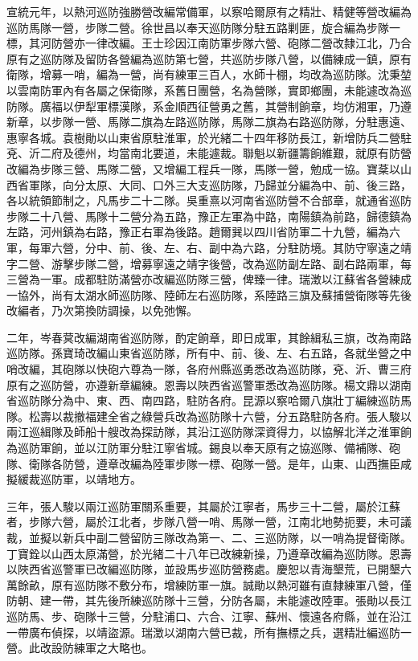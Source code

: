 \begin{pinyinscope}
宣統元年，以熱河巡防強勝營改編常備軍，以察哈爾原有之精壯、精健等營改編為巡防馬隊一營，步隊二營。徐世昌以奉天巡防隊分駐五路剿匪，旋合編為步隊一標，其河防營亦一律改編。王士珍因江南防軍步隊六營、砲隊二營改隸江北，乃合原有之巡防隊及留防各營編為巡防第七營，共巡防步隊八營，以備練成一鎮，原有衛隊，增募一哨，編為一營，尚有練軍三百人，水師十棚，均改為巡防隊。沈秉堃以雲南防軍內有各屬之保衛隊，系舊日團營，名為營隊，實即鄉團，未能遽改為巡防隊。廣福以伊犁軍標漢隊，系金順西征營勇之舊，其營制餉章，均仿湘軍，乃遵新章，以步隊一營、馬隊二旗為左路巡防隊，馬隊二旗為右路巡防隊，分駐惠遠、惠寧各城。袁樹勛以山東省原駐淮軍，於光緒二十四年移防長江，新增防兵二營駐兗、沂二府及德州，均當南北要道，未能遽裁。聯魁以新疆籌餉維艱，就原有防營改編為步隊三營、馬隊二營，又增編工程兵一隊，馬隊一營，勉成一協。寶棻以山西省軍隊，向分太原、大同、口外三大支巡防隊，乃歸並分編為中、前、後三路，各以統領節制之，凡馬步二十二隊。吳重熹以河南省巡防營不合部章，就通省巡防步隊二十八營、馬隊十二營分為五路，豫正左軍為中路，南陽鎮為前路，歸德鎮為左路，河州鎮為右路，豫正右軍為後路。趙爾巽以四川省防軍二十九營，編為六軍，每軍六營，分中、前、後、左、右、副中為六路，分駐防境。其防守寧遠之靖字二營、游擊步隊二營，增募寧遠之靖字後營，改為巡防副左路、副右路兩軍，每三營為一軍。成都駐防滿營亦改編巡防隊三營，俾臻一律。瑞澂以江蘇省各營練成一協外，尚有太湖水師巡防隊、陸師左右巡防隊，系陸路三旗及蘇捕營衛隊等先後改編者，乃次第換防調操，以免弛懈。

二年，岑春蓂改編湖南省巡防隊，酌定餉章，即日成軍，其餘緝私三旗，改為南路巡防隊。孫寶琦改編山東省巡防隊，所有中、前、後、左、右五路，各就坐營之中哨改編，其砲隊以快砲六尊為一隊，各府州縣巡勇悉改為巡防隊，兗、沂、曹三府原有之巡防營，亦遵新章編練。恩壽以陜西省巡警軍悉改為巡防隊。楊文鼎以湖南省巡防隊分為中、東、西、南四路，駐防各府。昆源以察哈爾八旗壯丁編練巡防馬隊。松壽以裁撤福建全省之綠營兵改為巡防隊十六營，分五路駐防各府。張人駿以兩江巡緝隊及師船十艘改為探訪隊，其沿江巡防隊深資得力，以協解北洋之淮軍餉為巡防軍餉，並以江防軍分駐江寧省城。錫良以奉天原有之協巡隊、備補隊、砲隊、衛隊各防營，遵章改編為陸軍步隊一標、砲隊一營。是年，山東、山西撫臣咸擬緩裁巡防軍，以靖地方。

三年，張人駿以兩江巡防軍關系重要，其屬於江寧者，馬步三十二營，屬於江蘇者，步隊六營，屬於江北者，步隊八營一哨、馬隊一營，江南北地勢扼要，未可議裁，並擬以新兵中副二營留防三隊改為第一、二、三巡防隊，以一哨為提督衛隊。丁寶銓以山西太原滿營，於光緒二十八年已改練新操，乃遵章改編為巡防隊。恩壽以陜西省巡警軍已改編巡防隊，並設馬步巡防營務處。慶恕以青海墾荒，已開墾六萬餘畝，原有巡防隊不敷分布，增練防軍一旗。誠勛以熱河雖有直隸練軍八營，僅防朝、建一帶，其先後所練巡防隊十三營，分防各屬，未能遽改陸軍。張勛以長江巡防馬、步、砲隊十三營，分駐浦口、六合、江寧、蘇州、懷遠各府縣，並在沿江一帶廣布偵探，以靖盜源。瑞澂以湖南六營已裁，所有撫標之兵，選精壯編巡防一營。此改設防練軍之大略也。


\end{pinyinscope}
